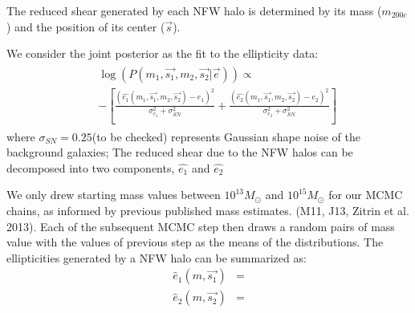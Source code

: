 The reduced shear generated by each NFW halo is determined by its
mass ($m_{200c}$) and the position of its center ($\vec{s}$). 
\par
We consider the joint posterior as the fit to the ellipticity data:
\begin{align}
    &\begin{aligned}
    &\log(P( m_{1}, \vec{s_{1}}, m_{2}, \vec{s_{2}} | \vec{e} )) \propto\\
    &-\left[\frac{(\hat{e_1}(m_1, \vec{s_1}, m_2, \vec{s_2}) - e_1)^2
    }{\sigma_{e_1}^2+\sigma_{SN}^2 }+ 
    \frac{(\hat{e_2}(m_1, \vec{s_1}, m_2, \vec{s_2}) - e_2)^2
    }{\sigma_{e_2}^2+\sigma_{SN}^2 }\right] \label{eqn:jointposterior} 
    \end{aligned}
\end{align} 
where $\sigma_{SN} = 0.25$(to be checked) represents Gaussian shape noise
of the background galaxies; The reduced shear due to the NFW halos can be
decomposed into two components, $\hat{e_1}$ and $\hat{e_2}$  

We only drew starting mass values between
$10^{13} M_\odot$ and $10^{15} M_\odot$ for our MCMC
chains, as informed by previous published mass estimates. (M11, J13, Zitrin et al. 2013). Each of the subsequent MCMC step then
draws a random pairs of mass value with the values of
previous step as the means of the distributions. 
The ellipticities generated by a NFW halo can be summarized as:
\begin{align}
    \hat{e}_1(m, \vec{s_1}) &=\\
    \hat{e}_2(m, \vec{s_2}) &= 
\end{align}

 
